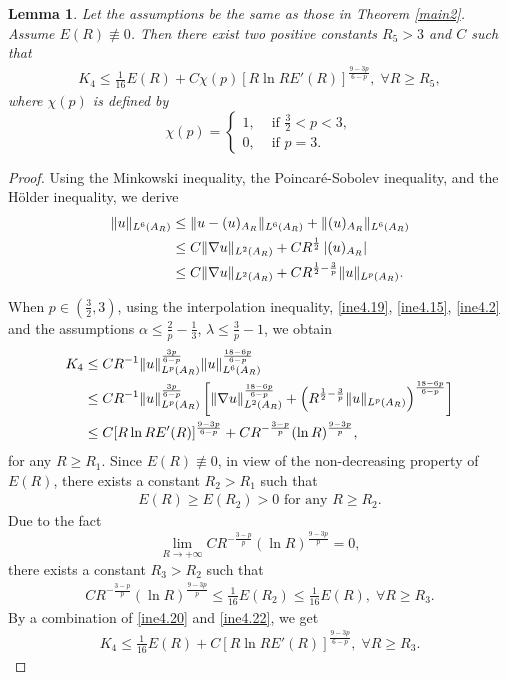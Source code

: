\documentclass[11pt,reqno]{amsart}
\newtheorem{Lem}{Lemma}[section]
\numberwithin{Thm}{section}
\begin{document}
\begin{Lem}\label{Lem4.6}
Let the assumptions be the same as those in {\rm Theorem \ref{main2}}. Assume $E(R)\not\equiv0$. Then there exist two positive constants $R_5>3$ and $C$ such that
\begin{align}\label{ine4.18}
K_4\leq \frac{1}{16}E(R)+C\chi(p)\left[R\ln R E'(R)\right]^{\frac{9-3p}{6-p}},\;\forall R\geq R_5,
\end{align}
where $\chi(p)$ is defined by
\begin{equation*}
\chi(p)=
\begin{cases}
1, & \text{ if  }\frac{3}{2}<p<3, \\
0, & \text{ if  } p=3.
\end{cases}
\end{equation*}
\end{Lem}
\begin{proof}
Using the Minkowski inequality, the Poincar\'{e}-Sobolev inequality,  and the H\"{o}lder inequality, we derive
	\begin{align}\label{ine4.19}
		\|u\|_{L^6(A_R)}&\leq \|u-(u)_{A_R}\|_{L^6(A_R)}+\|(u)_{A_R}\|_{L^6(A_R)}\notag\\
		&\leq C\|\nabla u\|_{L^2 (A_R)}+CR^\frac{1}{2}\left|(u)_{A_R}\right|\\
		&\leq C\|\nabla u\|_{L^2 (A_R)}+CR^{\frac{1}{2}-\frac{3}{p}}\|u\|_{L^p(A_R)}.\notag
	\end{align}

When $p\in\left(\frac{3}{2},3\right)$, using the interpolation inequality, \eqref{ine4.19}, \eqref{ine4.15}, \eqref{ine4.2} and the assumptions $\alpha\leq\frac{2}{p}-\frac{1}{3}$, $\lambda\leq\frac{3}{p}-1$, we obtain
	\begin{align}\label{ine4.20}
		K_4&\leq CR^{-1}\|u\|_{L^p(A_R)}^\frac{3p}{6-p}\|u\|_{L^6(A_R)}^\frac{18-6p}{6-p}\notag\\
		&\leq CR^{-1}\|u\|_{L^p(A_R)}^{\frac{3p}{6-p}}\left[\|\nabla u\|_{L^2(A_R)}^\frac{18-6p}{6-p}+\left(R^{\frac{1}{2}-\frac{3}{p}}\|u\|_{L^p(A_R)}\right)^\frac{18-6p}{6-p}\right]\\
        &\leq C[R\ln RE'(R)]^\frac{9-3p}{6-p}+CR^{-\frac{3-p}{p}}(\ln R)^\frac{9-3p}{p},\notag
	\end{align}
for any $R\geq R_1$.
Since $E(R)\not\equiv0$, in view of the non-decreasing property of $E(R)$, there exists a constant $R_2>R_1$ such that
\begin{align}\label{ine4.21}
\text{$E(R)\geq E(R_2)>0$ for any $R\geq R_2$.}
\end{align}
Due to the fact
$$
\lim\limits_{R\rightarrow+\infty}CR^{-\frac{3-p}{p}}(\ln R)^\frac{9-3p}{p}=0,
$$
there exists a constant $R_3>R_2$ such that
\begin{align}\label{ine4.22}
CR^{-\frac{3-p}{p}}(\ln R)^\frac{9-3p}{p}\leq\frac{1}{16}E(R_2)\leq \frac{1}{16}E(R),\;\forall R\geq R_3.
\end{align}
By a combination of \eqref{ine4.20} and \eqref{ine4.22}, we get
\begin{align}\label{ine4.23}
K_4\leq \frac{1}{16}E(R)+C\left[R\ln R E'(R)\right]^{\frac{9-3p}{6-p}},\;\forall R\geq R_3.
\end{align}


\end{proof}
\end{document}
